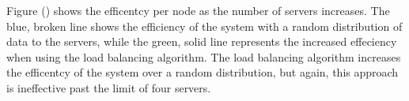 \documentclass{article}
\newenvironment{Figure}
               {\par\medskip\noindent\minipage{\linewidth}}
               {\endminipage\par\medskip}
\begin{document}
\begin{multicols}{2}
\begin{Figure}
   \centering
\noindent{}
\end{Figure}

Figure () shows the efficentcy per node as the number of servers increases.  The blue, broken line shows the efficiency of the system with a random distribution of data to the servers, while the green, solid line represents the increased effeciency when using the load balancing algorithm.  The load balancing algorithm increases the efficentcy of the system over a random distribution, but again, this approach is ineffective past the limit of four servers.


\end{multicols}
\end{document}
